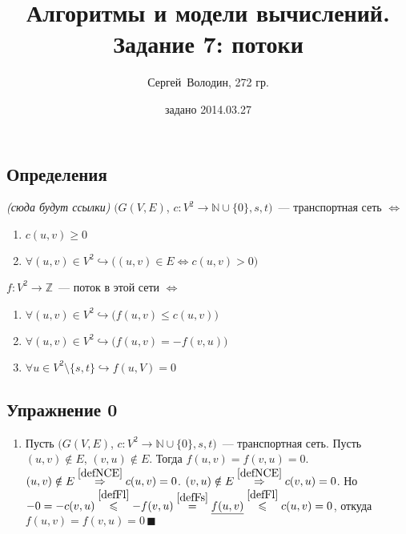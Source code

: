 \documentclass[a4paper]{article}
\date{задано 2014.03.27}
\author{Сергей~Володин, 272 гр.}
\title{Алгоритмы и модели вычислений.\\Задание 7: потоки}
\newcommand{\ZZ}{\mathbb{Z}}
\newcommand{\Nz}{\mathbb{N}\cup\{0\}}
\begin{document}
\maketitle
\subsection*{Определения}
{\em (сюда будут ссылки)}\newline
$(G(V,E)$, $c\colon V^2\to\Nz, s, t)$~--- транспортная сеть $\Leftrightarrow$ \begin{enumerate}
\item \label{defNCg0}$c(u,v)\geqslant 0$
\item \label{defNCE} $\forall (u,v)\in V^2\hookrightarrow \big((u,v)\in E\Leftrightarrow c(u,v)>0\big)$
\end{enumerate}
$f\colon V^2\to\ZZ$~--- поток в этой сети $\Leftrightarrow$\begin{enumerate}
\item \label{defFl} $\forall(u,v)\in V^2\hookrightarrow \big(f(u,v)\leqslant c(u,v)\big)$
\item \label{defFs} $\forall(u,v)\in V^2\hookrightarrow \big(f(u,v)=-f(v,u)\big)$
\item \label{defFc} $\forall u\in V^2\setminus\{s,t\}\hookrightarrow f(u,V)=0$
\end{enumerate}
\subsection*{Упражнение 0}
\begin{enumerate}
\item \label{uvvu0} Пусть $(G(V,E)$, $c\colon V^2\to\Nz, s, t)$~--- транспортная сеть. Пусть $(u,v)\notin E$, $(v,u)\notin E$. Тогда $f(u,v)=f(v,u)=0$.\newline
$(u,v)\notin E\overset{\ref{defNCE}}{\Rightarrow} c(u,v)=0$. $(v,u)\notin E\overset{\ref{defNCE}}{\Rightarrow} c(v,u)=0$. Но $-0=-c(v,u)\overset{\ref{defFl}}{\leqslant} -f(v,u)\overset{\ref{defFs}}{=}\underline{f(u,v)}\overset{\ref{defFl}}{\leqslant} c(u,v)=0$, откуда $f(u,v)=f(v,u)=0\,\blacksquare$
\end{enumerate}
\end{document}
